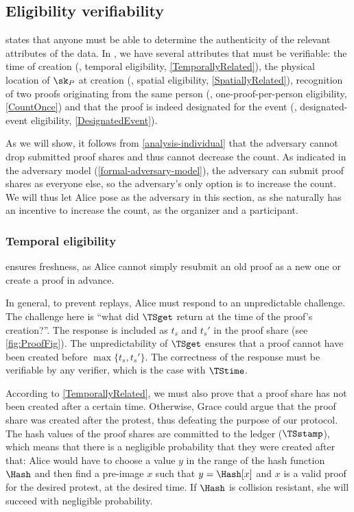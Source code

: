 
\subsection{Eligibility verifiability}%
\label{analysis-eligibility}

 states that anyone must be able to determine the authenticity of the relevant attributes of the data.
In \CROCUS, we have several attributes that must be verifiable: the time of 
creation (\ie, temporal eligibility, \cref{TemporallyRelated}), the physical 
location of \(\sk_P\) at creation (\ie, spatial eligibility, 
\cref{SpatiallyRelated}), recognition of two proofs originating from the same 
person (\ie, one-proof-per-person eligibility, \cref{CountOnce}) and that the 
proof is indeed designated for the event (\ie, designated-event eligibility, 
\cref{DesignatedEvent}).

As we will show, it follows from \cref{analysis-individual} that the adversary 
cannot drop submitted proof shares and thus cannot decrease the count.
As indicated in the adversary model (\cref{formal-adversary-model}), the 
adversary can submit proof shares as everyone else, so the adversary's only 
option is to increase the count.
We will thus let Alice pose as the adversary in this section, as she naturally 
has an incentive to increase the count, as the organizer and a participant.

\subsubsection{Temporal eligibility}%
\label{analysis-temporal}

 ensures freshness, as Alice cannot simply resubmit an 
old proof as a new one or create a proof in advance.

In general, to prevent replays, Alice must respond to an unpredictable 
challenge.
The challenge here is \enquote{what did \(\TSget\) return at the time of the 
  proof's creation?}.
The response is included as \(t_s\) and \(t_s'\) in the proof share (see 
\cref{fig:ProofFig}).
The unpredictability of \(\TSget\) ensures that a proof cannot have been 
created before \(\max\{t_s, t_s'\}\).
The correctness of the response must be verifiable by any verifier, which is 
the case with \(\TStime\).

According to \cref{TemporallyRelated}, we must also prove that a proof share has not been created after a certain time.
Otherwise, Grace could argue that the proof share was created after the protest, thus defeating the purpose of our protocol.
The hash values of the proof shares are committed to the ledger (\(\TSstamp\)), 
which means that there is a negligible probability that they were created after 
that:
Alice would have to choose a value \(y\) in the range of the hash function 
\(\Hash\) and then find a pre-image \(x\) such that \(y = \Hash[x]\) and \(x\) 
is a valid proof for the desired protest, at the desired time.
If \(\Hash\) is collision resistant, she will succeed with negligible 
probability.

